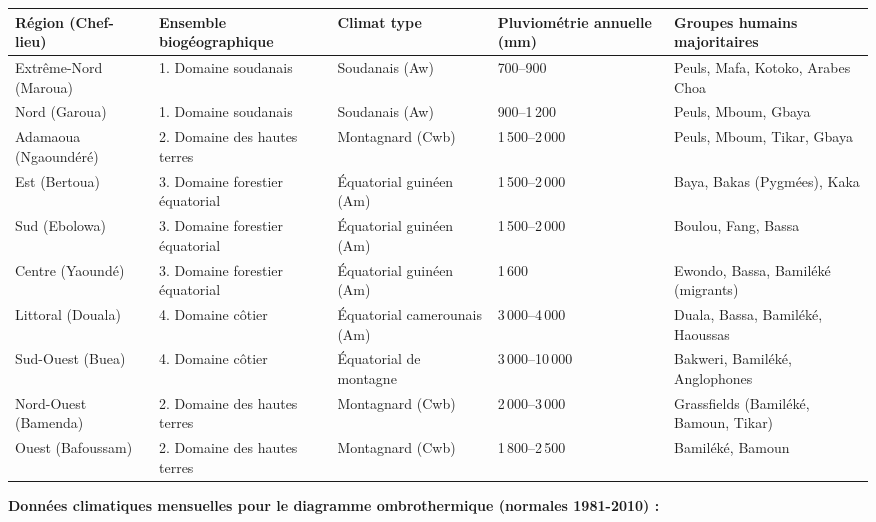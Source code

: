\documentclass[11pt]{article}
\begin{document}
\begin{center}
\begin{tabularx}{\linewidth}{|l|X|X|X|X|}\hline
\rowcolor{popblueL}
\textbf{Région (Chef-lieu)} & \textbf{Ensemble biogéographique} & \textbf{Climat type} & \textbf{Pluviométrie annuelle (mm)} & \textbf{Groupes humains majoritaires} \\ \hline
Extrême-Nord (Maroua) & 1. Domaine soudanais & Soudanais (Aw) & 700--900 & Peuls, Mafa, Kotoko, Arabes Choa \\ \hline
Nord (Garoua) & 1. Domaine soudanais & Soudanais (Aw) & 900--1\,200 & Peuls, Mboum, Gbaya \\ \hline
Adamaoua (Ngaoundéré) & 2. Domaine des hautes terres & Montagnard (Cwb) & 1\,500--2\,000 & Peuls, Mboum, Tikar, Gbaya \\ \hline
Est (Bertoua) & 3. Domaine forestier équatorial & Équatorial guinéen (Am) & 1\,500--2\,000 & Baya, Bakas (Pygmées), Kaka \\ \hline
Sud (Ebolowa) & 3. Domaine forestier équatorial & Équatorial guinéen (Am) & 1\,500--2\,000 & Boulou, Fang, Bassa \\ \hline
Centre (Yaoundé) & 3. Domaine forestier équatorial & Équatorial guinéen (Am) & 1\,600 & Ewondo, Bassa, Bamiléké (migrants) \\ \hline
Littoral (Douala) & 4. Domaine côtier & Équatorial camerounais (Am) & 3\,000--4\,000 & Duala, Bassa, Bamiléké, Haoussas \\ \hline
Sud-Ouest (Buea) & 4. Domaine côtier & Équatorial de montagne & 3\,000--10\,000 & Bakweri, Bamiléké, Anglophones \\ \hline
Nord-Ouest (Bamenda) & 2. Domaine des hautes terres & Montagnard (Cwb) & 2\,000--3\,000 & Grassfields (Bamiléké, Bamoun, Tikar) \\ \hline
Ouest (Bafoussam) & 2. Domaine des hautes terres & Montagnard (Cwb) & 1\,800--2\,500 & Bamiléké, Bamoun \\ \hline
\end{tabularx}
\end{center}

\medskip
\textbf{Données climatiques mensuelles pour le diagramme ombrothermique (normales 1981-2010) :}
\end{document}
